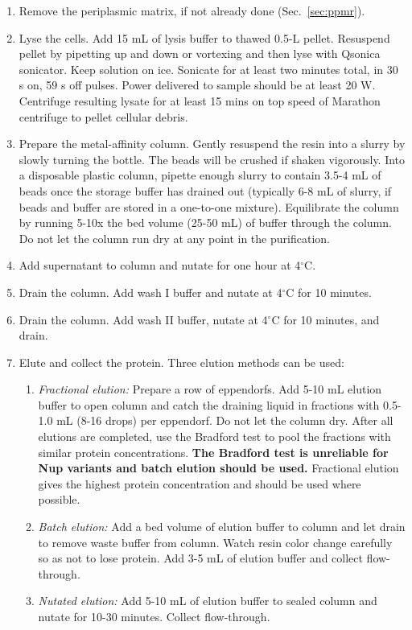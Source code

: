\begin{enumerate}
\item Remove the periplasmic matrix, if not already done (Sec.~\ref{sec:ppmr}).

\item Lyse the cells. Add 15 mL of lysis buffer to thawed 0.5-L pellet. Resuspend pellet by pipetting up and down or vortexing and then lyse with Qsonica sonicator.  Keep solution on ice. Sonicate for at least two minutes total, in 30 s on, 59 s off pulses.  Power delivered to sample should be at least 20 W.  Centrifuge resulting lysate for at least 15 mins on top speed of Marathon centrifuge to pellet cellular debris.
 
\item Prepare the metal-affinity column.  Gently resuspend the resin into a slurry by slowly turning the bottle.  The beads will be crushed if shaken vigorously. Into a disposable plastic column, pipette enough slurry to contain 3.5-4 mL of beads once the storage buffer has drained out (typically 6-8 mL of slurry, if beads and buffer are stored in a one-to-one mixture).  Equilibrate the column by running 5-10x the bed volume (25-50 mL) of buffer through the column.  Do not let the column run dry at any point in the purification.
 
\item Add supernatant to column and nutate for one hour at 4$^\circ$C.

\item Drain the column. Add wash I buffer and nutate at 4$^\circ$C for 10 minutes.

\item Drain the column. Add wash II buffer, nutate at 4$^\circ$C for 10 minutes, and drain.

\item Elute and collect the protein.  Three elution methods can be used:
\begin{enumerate}
\item \textit{Fractional elution:} Prepare a row of eppendorfs.  Add 5-10 mL elution buffer to open column and catch the draining liquid in fractions with 0.5-1.0 mL (8-16 drops) per eppendorf.  Do not let the column dry.  After all elutions are completed, use the Bradford test to pool the fractions with similar protein concentrations.  \textbf{The Bradford test is unreliable for Nup variants and batch elution should be used.} Fractional elution gives the highest protein concentration and should be used where possible.
\item \textit{Batch elution:} Add a bed volume of elution buffer to column and let drain to remove waste buffer from column.  Watch resin color change carefully so as not to lose protein.  Add 3-5 mL of elution buffer and collect flow-through.
\item \textit{Nutated elution:} Add 5-10 mL of elution buffer to sealed column and nutate for 10-30 minutes.  Collect flow-through.
\end{enumerate}


\end{enumerate}
